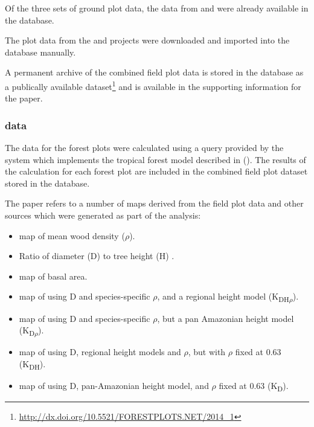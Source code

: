 \documentclass{article}
\begin{document}
Of the three sets of ground plot data, the data from \cite{rainfor} and
\cite{atdn} were already available in the \cite{forest-plots} database.

The plot data from the \cite{team} and \cite{ppbio} projects were downloaded
and imported into the \cite{forest-plots} database manually.

A permanent archive of the combined field plot data is stored
in the \cite{forest-plots} database as a publically available
dataset\footnote{\url{http://dx.doi.org/10.5521/FORESTPLOTS.NET/2014_1}}
and is available in the supporting information for the paper.

\subsubsection{\cite{term-agb} data}

The \cite{term-agb} data for the forest plots were calculated using a
\cite{comp-lang-sql} query provided by the \cite{forest-plots} system which
implements the tropical forest model described in 
(\cite{chave-2005}).
The results of the \cite{term-agb} calculation for each forest plot are
included in the combined field plot dataset stored in the \cite{forest-plots}
database.

The paper refers to a number of maps derived from the field plot data and
other sources which were generated as part of the analysis:

\begin{itemize}
    \item \cite{kriged} map of mean wood density ($\rho$).
    \item Ratio of diameter (D) to tree height (H) \cite{feldpausch-2012}.
    \item \cite{kriged} map of basal area.
    \item \cite{kriged} map of \cite{term-agb} using D and species-specific
    $\rho$, and a regional height model (K\textsubscript{DH$\rho$}).
    \item \cite{kriged} map of \cite{term-agb} using D and species-specific
    $\rho$, but a pan Amazonian height model (K\textsubscript{D$\rho$}).
    \item \cite{kriged} map of \cite{term-agb} using D, regional height
    models and $\rho$, but with $\rho$ fixed at 0.63 (K\textsubscript{DH}).
    \item \cite{kriged} map of \cite{term-agb} using D, pan-Amazonian height
    model, and $\rho$ fixed at 0.63 (K\textsubscript{D}).
\end{itemize}
\end{document}
